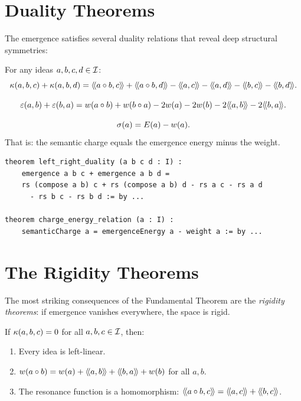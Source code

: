 \section{Duality Theorems}

The emergence satisfies several duality relations that reveal deep structural
symmetries:

\begin{theorem}
\label{thm:left-right-duality}
For any ideas $a, b, c, d \in \mathcal{I}$:
\[
  \emerge(a, b, c) + \emerge(a, b, d) = \rs{a \compose b}{c} + \rs{a \compose b}{d}
  - \rs{a}{c} - \rs{a}{d} - \rs{b}{c} - \rs{b}{d}.
\]
\end{theorem}

\begin{theorem}
\label{thm:emergence-curvature-duality}
\[
  \varepsilon(a,b) + \varepsilon(b,a) = w(a \circ b) + w(b \circ a)
  - 2w(a) - 2w(b) - 2\langle\!\langle a, b \rangle\!\rangle - 2\langle\!\langle b, a \rangle\!\rangle.
\]
\end{theorem}

\begin{theorem}
\label{thm:charge-energy}
\[
  \sigma(a) = E(a) - w(a).
\]
That is: the semantic charge equals the emergence energy minus the weight.
\end{theorem}

\begin{lstlisting}[caption={Duality theorems (IDT\_v3\_Emergence.lean)}]
theorem left_right_duality (a b c d : I) :
    emergence a b c + emergence a b d =
    rs (compose a b) c + rs (compose a b) d - rs a c - rs a d
      - rs b c - rs b d := by ...

theorem charge_energy_relation (a : I) :
    semanticCharge a = emergenceEnergy a - weight a := by ...
\end{lstlisting}


\section{The Rigidity Theorems}

The most striking consequences of the Fundamental Theorem are the \emph{rigidity
theorems}: if emergence vanishes everywhere, the space is rigid.

\begin{theorem}
\label{thm:flat-rigidity}
If $\kappa(a,b,c) = 0$ for all $a, b, c \in \mathcal{I}$, then:
\begin{enumerate}
  \item Every idea is left-linear.
  \item $w(a \circ b) = w(a) + \langle\!\langle a, b \rangle\!\rangle + \langle\!\langle b, a \rangle\!\rangle + w(b)$
    for all $a, b$.
  \item The resonance function is a homomorphism: $\langle\!\langle a \circ b, c \rangle\!\rangle = \langle\!\langle a, c \rangle\!\rangle + \langle\!\langle b, c \rangle\!\rangle$.
\end{enumerate}
\end{theorem}


